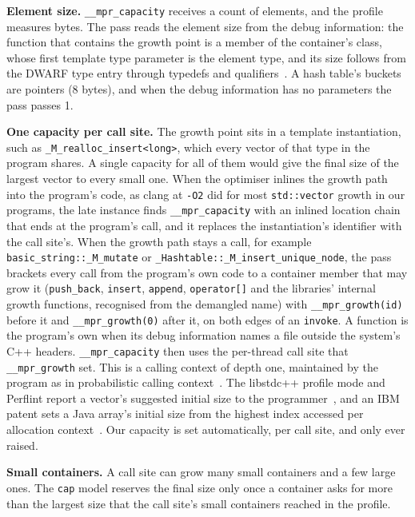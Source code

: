 \documentclass[11pt]{article}
\begin{document}
\textbf{Element size.} \texttt{\_\_mpr\_capacity} receives a count of elements, and the profile measures bytes. The
pass reads the element size from the debug information: the function that contains the growth point is a member
of the container's class, whose first template type parameter is the element type, and its size follows from the
DWARF type entry through typedefs and qualifiers~\cite{DWARF5}. A hash table's buckets are pointers (8 bytes), and
when the debug information has no parameters the pass passes 1.

\textbf{One capacity per call site.} The growth point sits in a template instantiation, such as
\texttt{\_M\_realloc\_insert<long>}, which every vector of that type in the program shares. A single capacity for all
of them would give the final size of the largest vector to every small one. When the optimiser inlines the growth
path into the program's code, as clang at \texttt{-O2} did for most \texttt{std::vector} growth in our programs, the late instance
finds \texttt{\_\_mpr\_capacity} with an inlined location chain that ends at the program's call, and it replaces the
instantiation's identifier with the call site's. When the growth path stays a call, for example
\texttt{basic\_string::\_M\_mutate} or \texttt{\_Hashtable::\_M\_insert\_unique\_node}, the pass brackets every call from
the program's own code to a container member that may grow it (\texttt{push\_back}, \texttt{insert},
\texttt{append}, \texttt{operator[]} and the libraries' internal growth functions, recognised from the demangled
name) with \texttt{\_\_mpr\_growth(id)} before it and \texttt{\_\_mpr\_growth(0)} after it, on both edges of an
\texttt{invoke}. A function is the program's own when its debug information names a file outside the system's
C++ headers. \texttt{\_\_mpr\_capacity} then uses the per-thread call site that \texttt{\_\_mpr\_growth} set. This is a
calling context of depth one, maintained by the program as in probabilistic calling context~\cite{Bond2007PCC}.
The libstdc++ profile mode and Perflint report a vector's suggested initial size to the
programmer~\cite{LibstdcxxProfile,Liu2009Perflint}, and an IBM patent sets a Java array's initial size from the
highest index accessed per allocation context~\cite{Odaira2015ArraySize}. Our capacity is set automatically, per
call site, and only ever raised.

\textbf{Small containers.} A call site can grow many small containers and a few large ones. The \texttt{cap} model
reserves the final size only once a container asks for more than the largest size that the call site's small
containers reached in the profile.
\end{document}

